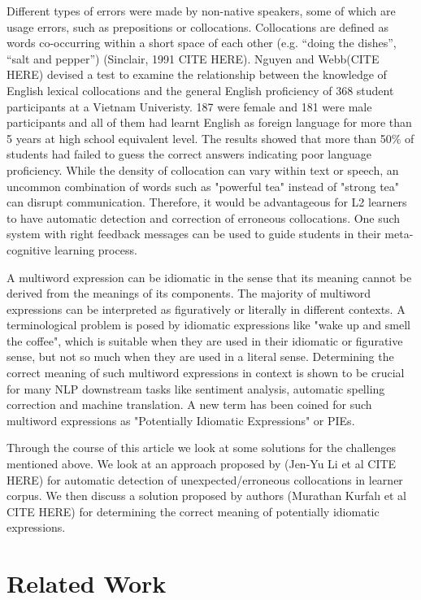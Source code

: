 \documentclass[11pt,a4paper]{article}
\begin{document}
Different types of errors were made by non-native speakers, some of which are usage errors, such as prepositions or collocations. Collocations are defined as words co-occurring within a short space of each other (e.g. “doing the dishes”, “salt and pepper”) (Sinclair, 1991 CITE HERE).
Nguyen and Webb(CITE HERE) devised a test to examine the relationship between the knowledge of English lexical collocations and the general English proficiency of 368 student participants at a Vietnam Univeristy. 
187 were female and 181 were male participantsand all of them had learnt English as foreign language for more than 5 years at high school equivalent level. The results showed that more than 50$\%$ of students had failed to guess the correct answers indicating poor language proficiency.
While the density of collocation can vary within text or speech, an uncommon combination of words such as "powerful tea" instead of "strong tea" can disrupt communication. Therefore, it would be advantageous for L2 learners to have automatic detection and correction of erroneous collocations. 
One such system with right feedback messages can be used to guide students in their meta-cognitive learning process.

A multiword expression can be idiomatic in the sense that its meaning cannot be derived from the meanings of its components. The majority of multiword expressions can be interpreted as figuratively or literally in different contexts. 
A terminological problem is posed by idiomatic expressions like "wake up and smell the coffee", which is suitable when they are used in their idiomatic or figurative sense, but not so much when they are used in a literal sense. 
Determining the correct meaning of such multiword expressions in context is shown to be crucial for many NLP downstream tasks like sentiment analysis, automatic spelling correction and machine translation. A new term has been coined for such multiword expressions as "Potentially Idiomatic Expressions" or PIEs.

Through the course of this article we look at some solutions for the challenges mentioned above. We look at an approach proposed by (Jen-Yu Li et al CITE HERE) for automatic detection of unexpected/erroneous collocations in learner
corpus. We then discuss a solution proposed by authors (Murathan Kurfalı et al CITE HERE) for determining the correct meaning of potentially idiomatic expressions.

\section{Related Work}
\end{document}
